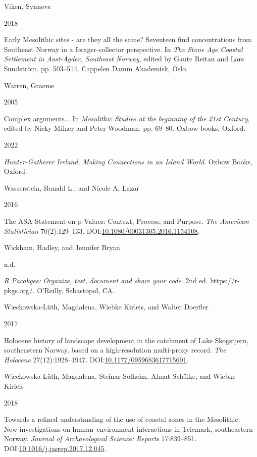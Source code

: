 \documentclass[
  12pt,
  a4paper,
  oneside]{book}
\newlength{\cslhangindent}
\newlength{\csllabelwidth}
\newlength{\cslentryspacingunit} %
\newenvironment{CSLReferences}[2] %
 {%
  \setlength{\parindent}{0pt}
  \ifodd #1
  \let\oldpar\par
  \def\par{\hangindent=\cslhangindent\oldpar}
  \fi
  \setlength{\parskip}{#2\cslentryspacingunit}
 }%
 {}
\newcommand{\CSLBlock}[1]{#1\hfill\break}
\newcommand{\CSLLeftMargin}[1]{\parbox[t]{\csllabelwidth}{#1}}
\newcommand{\CSLRightInline}[1]{\parbox[t]{\linewidth - \csllabelwidth}{#1}\break}
\begin{document}
\begin{CSLReferences}{0}{0}
\leavevmode{}%
\CSLBlock{Viken, Synnøve}
\CSLLeftMargin{ 2018}%
\CSLRightInline{{Early Mesolithic sites - are they all the same? Seventeen find concentrations from Southeast Norway in a forager-collector perspective}. In \emph{{The Stone Age Coastal Settlement in Aust-Agder, Southeast Norway}}, edited by Gaute Reitan and Lars Sundström, pp. 503--514. Cappelen Damm Akademisk, Oslo.}

\leavevmode{}%
\CSLBlock{Warren, Graeme}
\CSLLeftMargin{ 2005}%
\CSLRightInline{{Complex arguments...} In \emph{{Mesolithic Studies at the beginning of the 21st Century}}, edited by Nicky Milner and Peter Woodman, pp. 69--80. Oxbow books, Oxford.}

\leavevmode{}%
\CSLLeftMargin{ 2022 }%
\CSLRightInline{\emph{{Hunter-Gatherer Ireland. Making Connections in an Island World}}. Oxbow Books, Oxford.}

\leavevmode{}%
\CSLBlock{Wasserstein, Ronald L., and Nicole A. Lazar}
\CSLLeftMargin{ 2016}%
\CSLRightInline{{The ASA Statement on p-Values: Context, Process, and Purpose}. \emph{The American Statistician} 70(2):129--133. DOI:\href{https://doi.org/10.1080/00031305.2016.1154108}{10.1080/00031305.2016.1154108}.}

\leavevmode{}%
\CSLBlock{Wickham, Hadley, and Jennifer Bryan}
\CSLLeftMargin{ n.d.}%
\CSLRightInline{\emph{{R Pacakges: Organize, test, document and share your code}}. 2nd ed. {https://r-pkgs.org/}. O'Reilly, Sebastopol, CA.}

\leavevmode{}%
\CSLBlock{Wieckowska-Lüth, Magdalena, Wiebke Kirleis, and Walter Doerfler}
\CSLLeftMargin{ 2017}%
\CSLRightInline{{Holocene history of landscape development in the catchment of Lake Skogstjern, southeastern Norway, based on a high-resolution multi-proxy record}. \emph{The Holocene} 27(12):1928--1947. DOI:\href{https://doi.org/10.1177/0959683617715691}{10.1177/0959683617715691}.}

\leavevmode{}%
\CSLBlock{Wieckowska-Lüth, Magdalena, Steinar Solheim, Almut Schülke, and Wiebke Kirleis}
\CSLLeftMargin{ 2018}%
\CSLRightInline{{Towards a refined understanding of the use of coastal zones in the Mesolithic: New investigations on human--environment interactions in Telemark, southeastern Norway}. \emph{Journal of Archaeological Science: Reports} 17:839--851. DOI:\href{https://doi.org/10.1016/j.jasrep.2017.12.045}{10.1016/j.jasrep.2017.12.045}.}


\end{CSLReferences}
\end{document}
